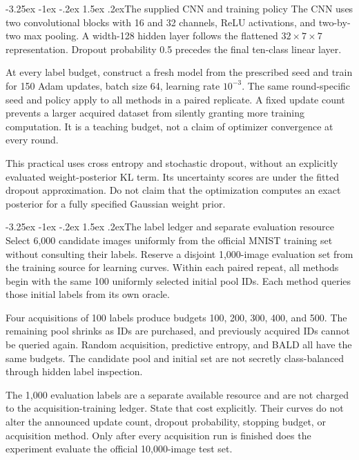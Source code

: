 \documentclass[11pt,a4paper]{article}
\makeatletter
\renewcommand\subsection{\@startsection{subsection}{2}{\z@}%
  {-3.25ex \@plus -1ex \@minus -.2ex}%
  {1.5ex \@plus .2ex}{\normalfont\large}}
\makeatother
\begin{document}
\subsection{The supplied CNN and training policy}
The CNN uses two convolutional blocks with 16 and 32 channels, ReLU activations,
and two-by-two max pooling. A width-128 hidden layer follows the flattened
$32\times7\times7$ representation. Dropout probability 0.5 precedes the final
ten-class linear layer.

At every label budget, construct a fresh model from the prescribed seed and
train for 150 Adam updates, batch size 64, learning rate $10^{-3}$. The same
round-specific seed and policy apply to all methods in a paired replicate.
A fixed update count prevents a larger acquired dataset from silently granting
more training computation. It is a teaching budget, not a claim of optimizer
convergence at every round.

This practical uses cross entropy and stochastic dropout, without an explicitly
evaluated weight-posterior KL term. Its uncertainty scores are under the fitted
dropout approximation. Do not claim that the optimization computes an exact
posterior for a fully specified Gaussian weight prior.

\subsection{The label ledger and separate evaluation resource}
Select 6,000 candidate images uniformly from the official MNIST training set
without consulting their labels. Reserve a disjoint 1,000-image evaluation
set from the training source for learning curves. Within each paired repeat,
all methods begin with the same 100 uniformly selected initial pool IDs.
Each method queries those initial labels from its own oracle.

Four acquisitions of 100 labels produce budgets 100, 200, 300, 400, and 500.
The remaining pool shrinks as IDs are purchased, and previously acquired IDs
cannot be queried again. Random acquisition, predictive entropy, and BALD all
have the same budgets. The candidate pool and initial set are not secretly
class-balanced through hidden label inspection.

The 1,000 evaluation labels are a separate available resource and are not
charged to the acquisition-training ledger. State that cost explicitly. Their
curves do not alter the announced update count, dropout probability, stopping
budget, or acquisition method. Only after every acquisition run is finished
does the experiment evaluate the official 10,000-image test set.
\end{document}
